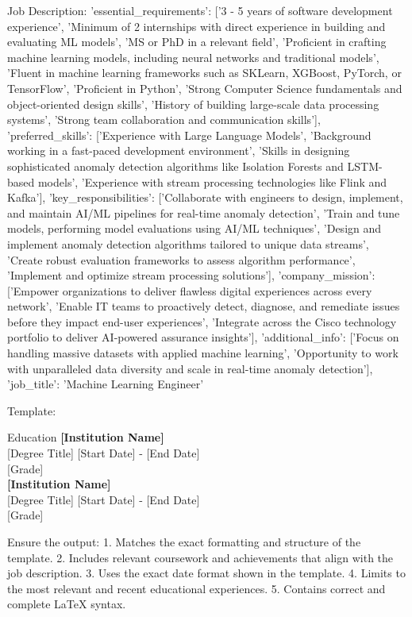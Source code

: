 \documentclass{resume}
\begin{document}
    Job Description:
    {'essential_requirements': ['3 - 5 years of software development experience', 'Minimum of 2 internships with direct experience in building and evaluating ML models', 'MS or PhD in a relevant field', 'Proficient in crafting machine learning models, including neural networks and traditional models', 'Fluent in machine learning frameworks such as SKLearn, XGBoost, PyTorch, or TensorFlow', 'Proficient in Python', 'Strong Computer Science fundamentals and object-oriented design skills', 'History of building large-scale data processing systems', 'Strong team collaboration and communication skills'], 'preferred_skills': ['Experience with Large Language Models', 'Background working in a fast-paced development environment', 'Skills in designing sophisticated anomaly detection algorithms like Isolation Forests and LSTM-based models', 'Experience with stream processing technologies like Flink and Kafka'], 'key_responsibilities': ['Collaborate with engineers to design, implement, and maintain AI/ML pipelines for real-time anomaly detection', 'Train and tune models, performing model evaluations using AI/ML techniques', 'Design and implement anomaly detection algorithms tailored to unique data streams', 'Create robust evaluation frameworks to assess algorithm performance', 'Implement and optimize stream processing solutions'], 'company_mission': ['Empower organizations to deliver flawless digital experiences across every network', 'Enable IT teams to proactively detect, diagnose, and remediate issues before they impact end-user experiences', 'Integrate across the Cisco technology portfolio to deliver AI-powered assurance insights'], 'additional_info': ['Focus on handling massive datasets with applied machine learning', 'Opportunity to work with unparalleled data diversity and scale in real-time anomaly detection'], 'job_title': 'Machine Learning Engineer'}

    Template:
    \begin{rSection}{Education}
{\bf [Institution Name]} \\ 
{[Degree Title]} \hfill
{[Start Date] - [End Date]} \\\hfill 
{[Grade]}
\vspace{0.25cm}\\
{\bf [Institution Name]} \\ 
{[Degree Title]} \hfill
{[Start Date] - [End Date]} \\\hfill 
{[Grade]}
\end{rSection}

    Ensure the output:
    1. Matches the exact formatting and structure of the template.
    2. Includes relevant coursework and achievements that align with the job description.
    3. Uses the exact date format shown in the template.
    4. Limits to the most relevant and recent educational experiences.
    5. Contains correct and complete LaTeX syntax.
    
\end{document}
